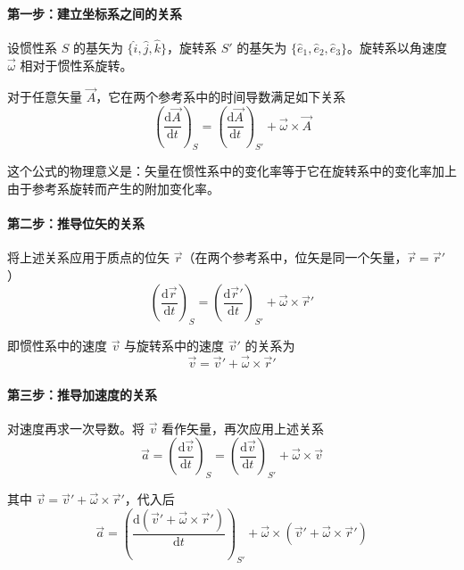 \paragraph*{第一步：建立坐标系之间的关系}

设惯性系 $S$ 的基矢为 $\{\hat{i}, \hat{j}, \hat{k}\}$，旋转系 $S'$ 的基矢为 $\{\hat{e}_1, \hat{e}_2, \hat{e}_3\}$。旋转系以角速度 $\vec{\omega}$ 相对于惯性系旋转。

对于任意矢量 $\vec{A}$，它在两个参考系中的时间导数满足如下关系
\begin{equation}
    \left(\frac{\mathrm{d}\vec{A}}{\mathrm{d}t}\right)_S = \left(\frac{\mathrm{d}\vec{A}}{\mathrm{d}t}\right)_{S'} + \vec{\omega} \times \vec{A}
\end{equation}

这个公式的物理意义是：矢量在惯性系中的变化率等于它在旋转系中的变化率加上由于参考系旋转而产生的附加变化率。

\paragraph*{第二步：推导位矢的关系}

将上述关系应用于质点的位矢 $\vec{r}$（在两个参考系中，位矢是同一个矢量，$\vec{r} = \vec{r}'$）
\begin{equation}
    \left(\frac{\mathrm{d}\vec{r}}{\mathrm{d}t}\right)_S = \left(\frac{\mathrm{d}\vec{r}'}{\mathrm{d}t}\right)_{S'} + \vec{\omega} \times \vec{r}'
\end{equation}

即惯性系中的速度 $\vec{v}$ 与旋转系中的速度 $\vec{v}'$ 的关系为
\begin{equation}
    \vec{v} = \vec{v}' + \vec{\omega} \times \vec{r}'
\end{equation}

\paragraph*{第三步：推导加速度的关系}

对速度再求一次导数。将 $\vec{v}$ 看作矢量，再次应用上述关系
\begin{equation}
    \vec{a} = \left(\frac{\mathrm{d}\vec{v}}{\mathrm{d}t}\right)_S = \left(\frac{\mathrm{d}\vec{v}}{\mathrm{d}t}\right)_{S'} + \vec{\omega} \times \vec{v}
\end{equation}

其中 $\vec{v} = \vec{v}' + \vec{\omega} \times \vec{r}'$，代入后
\begin{equation}
    \vec{a} = \left(\frac{\mathrm{d}(\vec{v}' + \vec{\omega} \times \vec{r}')}{\mathrm{d}t}\right)_{S'} + \vec{\omega} \times (\vec{v}' + \vec{\omega} \times \vec{r}')
\end{equation}

